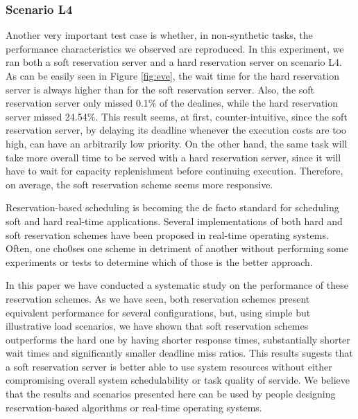 \documentclass[times, 10pt,twocolumn]{article}
\begin{document}
\subsubsection{Scenario L4}
\label{sec:scenario-l4}

Another very important test case is whether, in non-synthetic tasks,
the performance characteristics we observed are reproduced. In this
experiment, we ran both a soft reservation server and a hard
reservation server on scenario L4. As can be easily seen in Figure
\ref{fig:eve}, the wait time for the hard reservation server is always
higher than for the soft reservation server. Also, the soft
reservation server only missed 0.1\% of the dealines, while the hard
reservation server missed 24.54\%. This result seems, at first,
counter-intuitive, since the soft reservation server, by delaying its
deadline whenever the execution costs are too high, can have an
arbitrarily low priority. On the other hand, the same task will take
more overall time to be served with a hard reservation server, since
it will have to wait for capacity replenishment before continuing
execution. Therefore, on average, the soft reservation scheme seems
more responsive.

\label{sec:conclusion}

Reservation-based scheduling is becoming the de facto standard for
scheduling soft and hard real-time applications. Several
implementations of both hard and soft reservation schemes have been
proposed in real-time operating systems. Often, one cho0ses one scheme
in detriment of another without performing some experiments or tests
to determine which of those is the better approach.

In this paper we have conducted a systematic study on the performance
of these reservation schemes. As we have seen, both reservation
schemes present equivalent performance for several configurations,
but, using simple but illustrative load scenarios, we have shown that
soft reservation schemes outperforms the hard one by having shorter
response times, substantially shorter wait times and significantly
smaller deadline miss ratios. This results sugests that a soft
reservation server is better able to use system resources without
either compromising overall system schedulability or task quality of
servide. We believe that the results and scenarios presented here can
be used by people designing reservation-based algorithms or real-time
operating systems.



\end{document}
